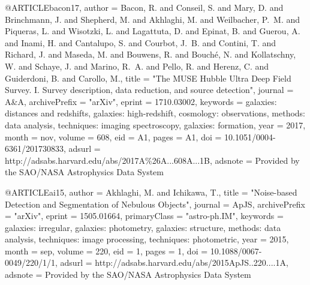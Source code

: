 @ARTICLE{bacon17,
   author = {{Bacon}, R. and {Conseil}, S. and {Mary}, D. and {Brinchmann}, J. and
	{Shepherd}, M. and {Akhlaghi}, M. and {Weilbacher}, P.~M. and
	{Piqueras}, L. and {Wisotzki}, L. and {Lagattuta}, D. and {Epinat}, B. and
	{Guerou}, A. and {Inami}, H. and {Cantalupo}, S. and {Courbot}, J.~B. and
	{Contini}, T. and {Richard}, J. and {Maseda}, M. and {Bouwens}, R. and
	{Bouch{\'e}}, N. and {Kollatschny}, W. and {Schaye}, J. and
	{Marino}, R.~A. and {Pello}, R. and {Herenz}, C. and {Guiderdoni}, B. and
	{Carollo}, M.},
    title = "{The MUSE Hubble Ultra Deep Field Survey. I. Survey description, data reduction, and source detection}",
  journal = {A\&A},
archivePrefix = "arXiv",
   eprint = {1710.03002},
 keywords = {galaxies: distances and redshifts, galaxies: high-redshift, cosmology: observations, methods: data analysis, techniques: imaging spectroscopy, galaxies: formation},
     year = 2017,
    month = nov,
   volume = 608,
      eid = {A1},
    pages = {A1},
      doi = {10.1051/0004-6361/201730833},
   adsurl = {http://adsabs.harvard.edu/abs/2017A\%26A...608A...1B},
  adsnote = {Provided by the SAO/NASA Astrophysics Data System}
}





@ARTICLE{ai15,
   author = {{Akhlaghi}, M. and {Ichikawa}, T.},
    title = "{Noise-based Detection and Segmentation of Nebulous Objects}",
  journal = {ApJS},
archivePrefix = "arXiv",
   eprint = {1505.01664},
 primaryClass = "astro-ph.IM",
 keywords = {galaxies: irregular, galaxies: photometry, galaxies: structure, methods: data analysis, techniques: image processing, techniques: photometric},
     year = 2015,
    month = sep,
   volume = 220,
      eid = {1},
    pages = {1},
      doi = {10.1088/0067-0049/220/1/1},
   adsurl = {http://adsabs.harvard.edu/abs/2015ApJS..220....1A},
  adsnote = {Provided by the SAO/NASA Astrophysics Data System}
}
